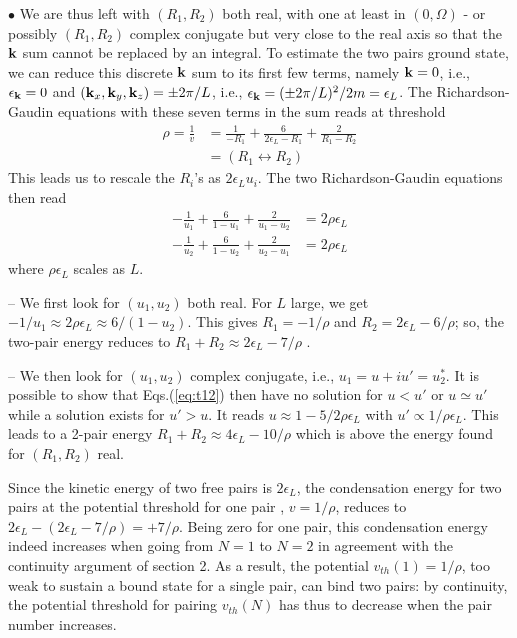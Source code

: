 \documentclass[5p,twocolumn]{elsarticle}
\begin{document}
$\bullet$ We are thus left with $(R_1,R_2)$ both real, with one at least in $(0,\Omega)$ - or possibly $(R_1,R_2)$ complex conjugate but very close to the real axis so that the $\mathbf{k}$ sum cannot be replaced by an integral. To estimate the two pairs ground state, we can reduce this discrete $\mathbf{k}$ sum to its first  few terms, namely $\mathbf{k}=0$, i.e., $\epsilon_{\mathbf{k}}=0$ and
 $(\mathbf{k}_x,\mathbf{k}_y,\mathbf{k}_z)=\pm 2\pi/L
 $, i.e., $\epsilon_{\mathbf{k}}=(\pm 2\pi/L)^2/2m=\epsilon_L$. The Richardson-Gaudin equations with these seven terms in the sum reads at threshold
\begin{equation}
\begin{split}
\rho=\frac{1}{v}&=\frac{1}{-R_{1}}+\frac{6}{2\epsilon_{L}-R_{1}}+\frac{2}{R_{1}-R_{2}}\\
&=(R_{1}\leftrightarrow{}R_{2})
\end{split}
\end{equation}
This leads us to rescale the $R_i$'s as $2\epsilon_L u_i$. The two Richardson-Gaudin equations then read
\begin{equation}
\begin{split}
-\frac{1}{u_{1}}+\frac{6}{1-u_{1}}+\frac{2}{u_{1}-u_{2}}&=2\rho\epsilon_{L}\\
-\frac{1}{u_{2}}+\frac{6}{1-u_{2}}+\frac{2}{u_{2}-u_{1}}&=2\rho\epsilon_{L}
\end{split}\label{eq:t12}
\end{equation}
where $\rho\epsilon_L$ scales as $L$.

-- We first look for $(u_1,u_2)$ both real. For $L$ large, we get $-1/u_1\approx 2 \rho\epsilon_L \approx 6/(1-u_2)$. This gives $R_1=-1/\rho$ and $R_2=2 \epsilon_L-6/\rho$; so, the two-pair energy reduces to $R_1+R_2\approx2 \epsilon_L-7/\rho$ .

--  We then look for $(u_1,u_2)$ complex conjugate, i.e., $u_1=u+iu'=u^*_2$. It is possible to show that Eqs.(\ref{eq:t12}) then have no solution for $u<u'$ or $u\simeq u'$ while a solution exists for $u'>u$. It reads $u\approx1-5/2\rho\epsilon_L$ with $u'\propto1/\rho\epsilon_L$. This leads to a 2-pair energy $R_1+R_2\approx4 \epsilon_L-10/\rho$ which is above the energy found for $(R_1,R_2)$ real.

Since the kinetic energy of two free pairs is $2\epsilon_L$, the condensation energy for two pairs at the potential threshold for one pair , $v=1/\rho$, reduces to 
$ 2\epsilon_L-(2 \epsilon_L-7/\rho)=+7/\rho$. Being zero for one pair, this condensation energy indeed increases when going from $N=1$ to $N=2$ in agreement with the continuity argument of section 2. As a result, the potential $v_{th}(1)=1/\rho$, too weak to sustain a bound state for a single pair, can bind two pairs: by continuity, the potential threshold for pairing $v_{th}(N)$ has thus to decrease when the pair number increases.
\end{document}
